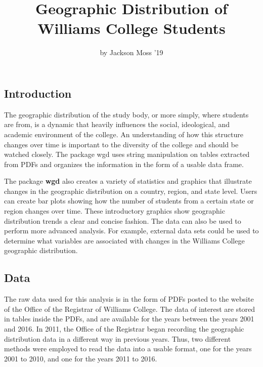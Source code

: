 \title{Geographic Distribution of Williams College Students}
\author{by Jackson Moss '19}

\maketitle


\subsection{Introduction}\label{introduction}

The geographic distribution of the study body, or more simply, where
students are from, is a dynamic that heavily influences the social,
ideological, and academic environment of the college. An understanding
of how this structure changes over time is important to the diversity of
the college and should be watched closely. The package wgd uses string
manipulation on tables extracted from PDFs and organizes the information
in the form of a usable data frame.

The package \textbf{wgd} also creates a variety of statistics and
graphics that illustrate changes in the geographic distribution on a
country, region, and state level. Users can create bar plots showing how
the number of students from a certain state or region changes over time.
These introductory graphics show geographic distribution trends a clear
and concise fashion. The data can also be used to perform more advanced
analysis. For example, external data sets could be used to determine
what variables are associated with changes in the Williams College
geographic distribution.

\subsection{Data}\label{data}

The raw data used for this analysis is in the form of PDFs posted to the
website of the Office of the Registrar of Williams College. The data of
interest are stored in tables inside the PDFs, and are available for the
years between the years 2001 and 2016. In 2011, the Office of the
Registrar began recording the geographic distribution data in a
different way in previous years. Thus, two different methods were
employed to read the data into a usable format, one for the years 2001
to 2010, and one for the years 2011 to 2016.

